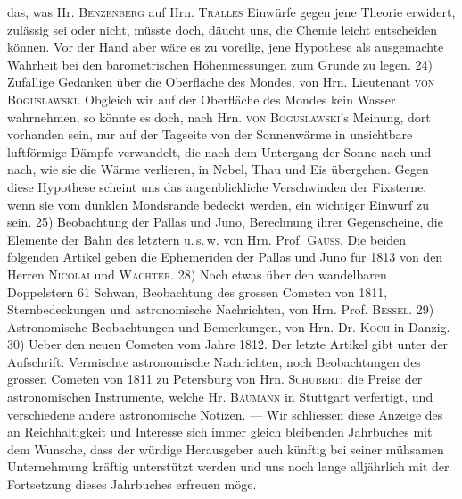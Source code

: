 das, was Hr. \textsc{Benzenberg} auf Hrn. \textsc{Tralles} Einwürfe gegen jene Theorie erwidert, zulässig sei oder nicht, müsste doch, däucht uns, die Chemie leicht entscheiden können. Vor der Hand aber wäre es zu voreilig, jene Hypothese als ausgemachte Wahrheit bei den barometrischen Höhenmessungen zum Grunde zu legen. 24) Zufällige Gedanken über die Oberfläche des Mondes, von Hrn. Lieutenant \textsc{von Boguslawski}. Obgleich wir auf der Oberfläche des Mondes kein Wasser wahrnehmen, so könnte es doch, nach Hrn. \textsc{von Boguslawski}'s Meinung, dort vorhanden sein, nur auf der Tagseite von der Sonnenwärme in unsichtbare luftförmige Dämpfe verwandelt, die nach dem Untergang der Sonne nach und nach, wie sie die Wärme verlieren, in Nebel, Thau und Eis übergehen. Gegen diese Hypothese scheint uns das augenblickliche Verschwinden der Fixsterne, wenn sie vom dunklen Mondsrande bedeckt werden, ein wichtiger Einwurf zu sein. 25) Beobachtung der Pallas und Juno, Berechnung ihrer Gegenscheine, die Elemente der Bahn des letztern u.\,s.\,w. von Hrn. Prof. \textsc{Gauss}. Die beiden folgenden Artikel geben die Ephemeriden der Pallas und Juno für 1813 von den Herren \textsc{Nicolai} und \textsc{Wachter}. 28) Noch etwas über den wandelbaren Doppelstern 61 Schwan, Beobachtung des grossen Cometen von 1811, Sternbedeckungen und astronomische Nachrichten, von Hrn. Prof. \textsc{Bessel}. 29) Astronomische Beobachtungen und Bemerkungen, von Hrn. Dr. \textsc{Koch} in Danzig. 30) Ueber den neuen Cometen vom Jahre 1812. Der letzte Artikel gibt unter der Aufschrift: Vermischte astronomische Nachrichten, noch Beobachtungen des grossen Cometen von 1811 zu Petersburg von Hrn. \textsc{Schubert}; die Preise der astronomischen Instrumente, welche Hr. \textsc{Baumann} in Stuttgart verfertigt, und verschiedene andere astronomische Notizen. --- Wir schliessen diese Anzeige des an Reichhaltigkeit und Interesse sich immer gleich bleibenden Jahrbuches mit dem Wunsche, dass der würdige Herausgeber auch künftig bei seiner mühsamen Unternehmung kräftig unterstützt werden und uns noch lange alljährlich mit der Fortsetzung dieses Jahrbuches erfreuen möge.
